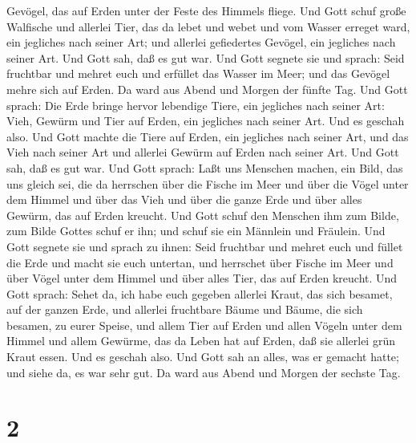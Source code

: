 Gevögel, das auf Erden unter der Feste des Himmels fliege. 
Und Gott schuf große Walfische und allerlei Tier, das da lebet und webet
und vom Wasser erreget ward, ein jegliches nach seiner Art; und allerlei
gefiedertes Gevögel, ein jegliches nach seiner Art. Und Gott sah, daß es
gut war.  Und Gott segnete sie und sprach: Seid fruchtbar
und mehret euch und erfüllet das Wasser im Meer; und das Gevögel mehre
sich auf Erden.  Da ward aus Abend und Morgen der fünfte
Tag.  Und Gott sprach: Die Erde bringe hervor lebendige
Tiere, ein jegliches nach seiner Art: Vieh, Gewürm und Tier auf Erden,
ein jegliches nach seiner Art. Und es geschah also.  Und
Gott machte die Tiere auf Erden, ein jegliches nach seiner Art, und das
Vieh nach seiner Art und allerlei Gewürm auf Erden nach seiner Art. Und
Gott sah, daß es gut war.  Und Gott sprach: Laßt uns
Menschen machen, ein Bild, das uns gleich sei, die da herrschen über die
Fische im Meer und über die Vögel unter dem Himmel und über das Vieh und
über die ganze Erde und über alles Gewürm, das auf Erden kreucht.
 Und Gott schuf den Menschen ihm zum Bilde, zum Bilde
Gottes schuf er ihn; und schuf sie ein Männlein und Fräulein.
 Und Gott segnete sie und sprach zu ihnen: Seid fruchtbar
und mehret euch und füllet die Erde und macht sie euch untertan, und
herrschet über Fische im Meer und über Vögel unter dem Himmel und über
alles Tier, das auf Erden kreucht.  Und Gott sprach: Sehet
da, ich habe euch gegeben allerlei Kraut, das sich besamet, auf der
ganzen Erde, und allerlei fruchtbare Bäume und Bäume, die sich besamen,
zu eurer Speise,  und allem Tier auf Erden und allen Vögeln
unter dem Himmel und allem Gewürme, das da Leben hat auf Erden, daß sie
allerlei grün Kraut essen. Und es geschah also.  Und Gott
sah an alles, was er gemacht hatte; und siehe da, es war sehr gut. Da
ward aus Abend und Morgen der sechste Tag.

\hypertarget{section-1}{%
\section{2}\label{section-1}}

